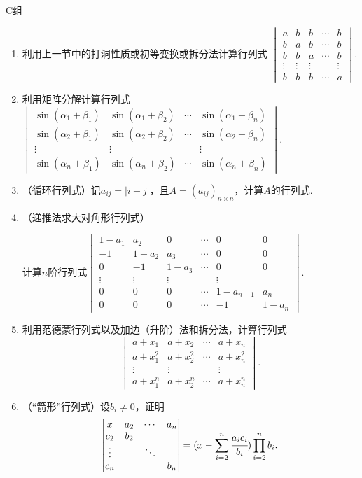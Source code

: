 \centerline{\heiti C组}
\begin{enumerate}
	\item 利用上一节中的打洞性质或初等变换或拆分法计算行列式
	$\begin{vmatrix}
		a & b & b &  \cdots & b \\
		b & a & b &  \cdots & b \\
		b & b & a &  \cdots & b \\
	  \vdots & \vdots & \vdots &  & \vdots  \\
		b & b & b & \cdots & a 
	  \end{vmatrix}$.

	\item 利用矩阵分解计算行列式$\begin{vmatrix}
		\sin(\alpha_1+\beta_1) & \sin(\alpha_1+\beta_2) & \cdots & \sin(\alpha_1+\beta_n) \\
		\sin(\alpha_2+\beta_1) & \sin(\alpha_2+\beta_2) & \cdots & \sin(\alpha_2+\beta_n) \\
	  \vdots & \vdots &  & \vdots  \\
	    \sin(\alpha_n+\beta_1) & \sin(\alpha_n+\beta_2) & \cdots & \sin(\alpha_n+\beta_n)
	  \end{vmatrix}$.

	\item （循环行列式）记$a_{ij}=|i-j|$，且$A=(a_{ij})_{n \times n}$，计算$A$的行列式.
	\item （递推法求大对角形行列式）
	
	计算$n$阶行列式$\begin{vmatrix}
		1-a_1 & a_2 & 0 &  \cdots & 0 & 0 \\
		-1 & 1-a_2 & a_3 &  \cdots & 0 & 0 \\
		0 & -1 & 1-a_3 &  \cdots & 0 & 0 \\
		\vdots & \vdots & \vdots &  & \vdots  \\
		0 & 0 & 0 & \cdots & 1-a_{n-1} & a_n \\
		0 & 0 & 0 & \cdots & -1 & 1-a_n 
	\end{vmatrix}$.

	\item 利用范德蒙行列式以及加边（升阶）法和拆分法，计算行列式
	$$\begin{vmatrix}
		a+x_1 & a+x_2 & \cdots & a+x_n \\
		a+x_1^2 & a+x_2^2 & \cdots & a+x_n^2 \\
	  \vdots & \vdots &  & \vdots  \\
		a+x_1^n & a+x_2^n & \cdots & a+x_n^n
	  \end{vmatrix}.$$
	\item （“箭形”行列式）设$b_i \neq 0$，证明
	$$\begin{vmatrix}
		x & a_2 & \cdots & a_n \\
		c_2 & b_2 &  &  \\
		\vdots &  & \ddots &  \\
		c_n &  &  & b_n
	\end{vmatrix}=(x-\sum_{i=2}^{n}\cfrac{a_ic_i}{b_i})\prod_{i=2}^nb_i.$$
\end{enumerate}

